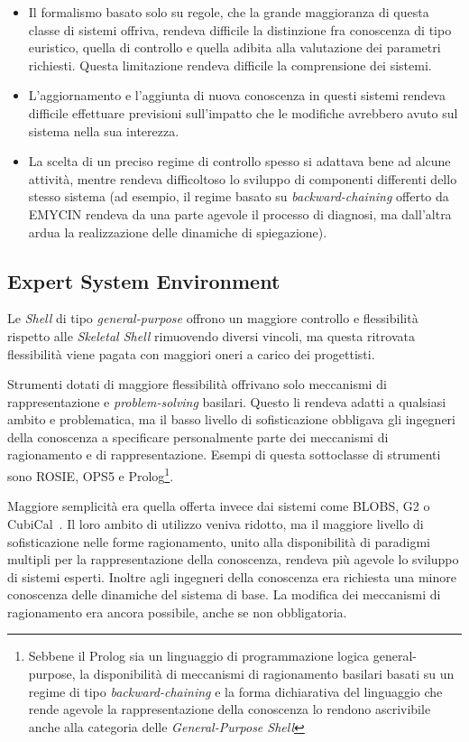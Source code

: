 \begin{itemize}
	\item[(1)] Il formalismo basato solo su regole, che la grande maggioranza di questa classe di sistemi offriva, rendeva difficile la distinzione fra conoscenza di tipo euristico, quella di controllo e quella adibita alla valutazione dei parametri richiesti. Questa limitazione rendeva difficile la comprensione dei sistemi.
	\item[(2)] L'aggiornamento e l'aggiunta di nuova conoscenza in questi sistemi rendeva difficile effettuare previsioni sull'impatto che le modifiche avrebbero avuto sul sistema nella sua interezza.
	\item[(3)] La scelta di un preciso regime di controllo spesso si adattava bene ad alcune attività, mentre rendeva difficoltoso lo sviluppo di componenti differenti dello stesso sistema (ad esempio, il regime basato su \emph{backward-chaining} offerto da EMYCIN rendeva da una parte agevole il processo di diagnosi, ma dall'altra ardua la realizzazione delle dinamiche di spiegazione).
\end{itemize}

\subsection{Expert System Environment}
Le \emph{Shell} di tipo \emph{general-purpose} offrono un maggiore controllo e flessibilità rispetto alle \emph{Skeletal Shell} rimuovendo diversi vincoli, ma questa ritrovata flessibilità viene pagata con maggiori oneri a carico dei progettisti. 

Strumenti dotati di maggiore flessibilità offrivano solo meccanismi di rappresentazione e \emph{problem-solving} basilari. Questo li rendeva adatti a qualsiasi ambito e problematica, ma il basso livello di sofisticazione obbligava gli ingegneri della conoscenza a specificare personalmente parte dei meccanismi di ragionamento e di rappresentazione. Esempi di questa sottoclasse di strumenti sono ROSIE, OPS5 e Prolog\footnote{Sebbene il Prolog sia un linguaggio di programmazione logica general-purpose, la disponibilità di meccanismi di ragionamento basilari basati su un regime di tipo \emph{backward-chaining} e la forma dichiarativa del linguaggio che rende agevole la rappresentazione della conoscenza lo rendono ascrivibile anche alla categoria delle \emph{General-Purpose Shell}}.

Maggiore semplicità era quella offerta invece dai sistemi come BLOBS, G2 o CubiCal~\cite{development1993}. Il loro ambito di utilizzo veniva ridotto, ma il maggiore livello di sofisticazione nelle forme ragionamento, unito alla disponibilità di paradigmi multipli per la rappresentazione della conoscenza, rendeva più agevole lo sviluppo di sistemi esperti. Inoltre agli ingegneri della conoscenza era richiesta una minore conoscenza delle dinamiche del sistema di base. La modifica dei meccanismi di ragionamento era ancora possibile, anche se non obbligatoria.


